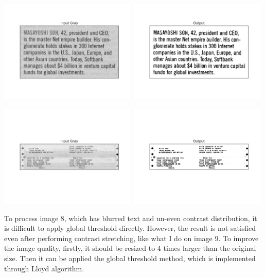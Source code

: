 \documentclass[titlepage]{article}
\begin{document}
\begin{center}
\includegraphics[width=0.49\textwidth]{img_6_gray.png}
\includegraphics[width=0.49\textwidth]{img_6_output.png}
\end{center}

\begin{center}
\includegraphics[width=0.49\textwidth]{img_7_gray.png}
\includegraphics[width=0.49\textwidth]{img_7_output.png}
\end{center}

To process image 8, which has blurred text and un-even contrast distribution,
it is difficult to apply global threshold directly. However, the result is not
satisfied even after performing contrast stretching, like what I do on
image 9. To improve the image quality, firstly, it should be resized to 4
times larger than the original size. Then it can be applied the global
threshold method, which is implemented through Lloyd algorithm.
\end{document}
